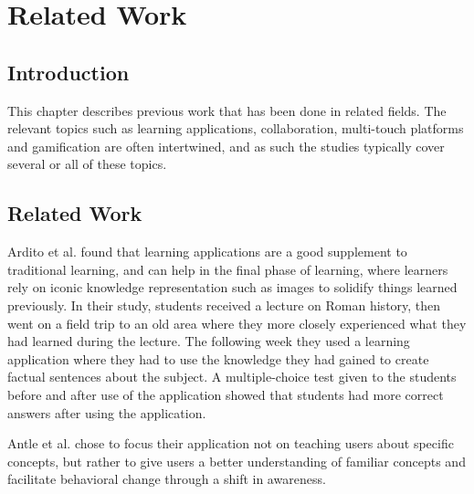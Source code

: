 
\chapter{Related Work}

\label{Chapter2}



\section{Introduction}

This chapter describes previous work that has been done in related fields. The relevant topics such as learning applications, collaboration, multi-touch platforms and gamification are often intertwined, and as such the studies typically cover several or all of these topics.


\section{Related Work}

Ardito et al.\citep{Ardito} found that learning applications are a good supplement to traditional learning, and can help in the final phase of learning, where learners rely on iconic knowledge representation such as images to solidify things learned previously. In their study, students received a lecture on Roman history, then went on a field trip to an old area where they more closely experienced what they had learned during the lecture. The following week they used a learning application where they had to use the knowledge they had gained to create factual sentences about the subject. A multiple-choice test given to the students before and after use of the application showed that students had more correct answers after using the application.

Antle et al.\citep{AntleFutura} chose to focus their application not on teaching users about specific concepts, but rather to give users a better understanding of familiar concepts and facilitate behavioral change through a shift in awareness.


